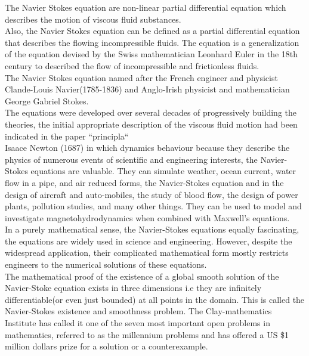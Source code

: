 \documentclass[11pt]{report}
\begin{document}
	The Navier Stokes equation are non-linear partial differential equation which describes the motion of viscous fluid substances.\\
	
	Also, the Navier Stokes equation can be defined as a partial differential equation that describes the flowing incompressible fluids. The equation is a generalization of the equation devised by the Swiss mathematician Leonhard Euler in the 18th century to described the flow of incompressible and frictionless fluids.\\
	
	The Navier Stokes equation named after the French engineer and physicist Clande-Louis Navier(1785-1836) and Anglo-Irish physicist and mathematician George Gabriel Stokes.\\
	
	The equations were developed over several decades of progressively building the theories, the initial appropriate description of the viscous fluid motion had been indicated in the paper ``principla``\\
	
	Isaace Newton (1687) in which dynamics behaviour because they describe the physics of numerous events of scientific and engineering interests, the Navier-Stokes equations are valuable. They can simulate weather, ocean current, water flow in a pipe, and air reduced forms, the Navier-Stokes equation and in the design of aircraft and auto-mobiles, the study of blood flow, the design of power plants, pollution studies, and many other things. They can be used to model and investigate magnetohydrodynamics when combined with Maxwell's equations.\\
	
	In a purely mathematical sense, the Navier-Stokes equations equally fascinating, the equations are widely used in science and engineering. However, despite the widespread application, their complicated mathematical form mostly restricts engineers to the numerical solutions of these equations.\\
	
	The mathematical proof of the existence of a global smooth solution of the Navier-Stoke equation exists in three dimensions i.e they are infinitely differentiable(or even just bounded) at all points in the domain. This is called the Navier-Stokes existence and smoothness problem. The Clay-mathematics Institute has called it one of the seven most important open problems in mathematics, referred to as the millennium problems and has offered a US \$1 million dollars prize for a solution or a counterexample.
	
\end{document}
